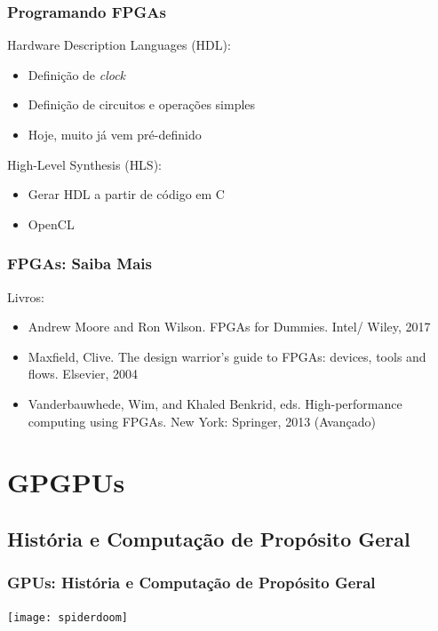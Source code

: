 \documentclass[10pt, compress]{beamer}
\begin{document}
\begin{frame}
    \frametitle{Programando FPGAs}
    Hardware Description Languages (\alert{HDL}):
    \begin{itemize}
        \item Definição de \textit{clock}
        \item Definição de circuitos e operações simples
        \item Hoje, muito já vem pré-definido
    \end{itemize}

    \pause

    High-Level Synthesis (\alert{HLS}):
    \begin{itemize}
        \item Gerar HDL a partir de \alert{código em C}
        \item \alert{OpenCL}
    \end{itemize}
\end{frame}

\begin{frame}
    \frametitle{FPGAs: Saiba Mais}
    Livros:

    \begin{itemize}
        \item Andrew Moore and Ron Wilson. FPGAs for Dummies. Intel/ Wiley, 2017
        \item Maxfield, Clive. The design warrior's guide to FPGAs: devices, tools and flows. Elsevier, 2004
        \item Vanderbauwhede, Wim, and Khaled Benkrid, eds. High-performance computing using FPGAs. New York: Springer, 2013 (Avançado)
    \end{itemize}
\end{frame}

\section{GPGPUs}

\subsection{História e Computação de Propósito Geral}

\begin{frame}
    \frametitle{GPUs: História e Computação de Propósito Geral}
    \begin{center}
        \texttt{[image: spiderdoom]}
    \end{center}
\end{frame}
\end{document}
